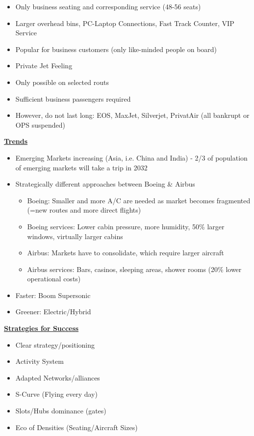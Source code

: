 \documentclass[9pt, landscape, fleqn]{scrartcl}
\begin{document}
\begin{multicols*}{3}
\begin{itemize}
    \item Only business seating and corresponding service (48-56 seats)
    \item Larger overhead bins, PC-Laptop Connections, Fast Track Counter, VIP Service 
    \item Popular for business customers (only like-minded people on board)
    \item Private Jet Feeling 
    \item Only possible on selected routs 
    \item Sufficient business passengers required 
    \item However, do not last long: EOS, MaxJet, Silverjet, PrivatAir (all bankrupt or OPS suspended)
\end{itemize}
\underline{\textbf{Trends}}
\begin{itemize}
    \item Emerging Markets increasing (Asia, i.e. China and India) - 2/3 of population of emerging markets will take a trip in 2032
    \item Strategically different approaches between Boeing \& Airbus 
    \begin{itemize}
        \item Boeing: Smaller and more A/C are needed as market becomes fragmented (=new routes and more direct flights)
        \item Boeing services: Lower cabin pressure, more humidity, 50\% larger windows, virtually larger cabins 
        \item Airbus: Markets have to consolidate, which require larger aircraft 
        \item Airbus services: Bars, casinos, sleeping areas, shower rooms (20\% lower operational costs)
    \end{itemize}
    \item Faster: Boom Supersonic 
    \item Greener: Electric/Hybrid 
\end{itemize}
\underline{\textbf{Strategies for Success}}
\begin{itemize}
    \item Clear strategy/positioning 
    \item Activity System 
    \item Adapted Networks/alliances 
    \item S-Curve (Flying every day)
    \item Slots/Hubs dominance (gates)
    \item Eco of Densities (Seating/Aircraft Sizes)

\end{itemize}
\end{multicols*}
\end{document}
